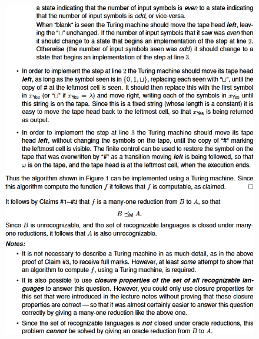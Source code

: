 \documentclass[8pt]{extarticle}
\begin{document}
\begin{figure}
\begin{minipage}{0.333\textwidth}
    \end{minipage}\hfill
    \begin{minipage}{0.333\textwidth}
        \centering
        \includegraphics[width=\linewidth]{reduction3.png}
    \end{minipage}\hfill
\end{figure}
\end{document}
